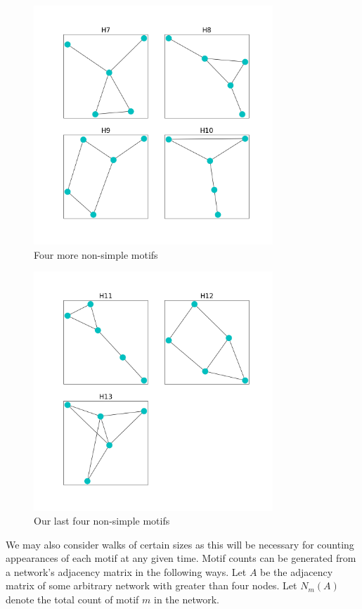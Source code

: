 \begin{figure}[h!]
    \includegraphics[width=9cm]{Images/motif_set_two.png}
    \centering
    \caption{Four more non-simple motifs}
\end{figure}

\begin{figure}
    \includegraphics[width=9cm]{Images/motif_set_three.png}
    \centering
    \caption{Our last four non-simple motifs}
\end{figure}

\FloatBarrier

We may also consider walks of certain sizes as this will be necessary for 
counting appearances of each motif at any given time. Motif counts can be generated from a network's adjacency matrix in the following ways. Let $A$
be the adjacency matrix of some arbitrary network with greater than four nodes. Let $N_m(A)$ denote 
the total count of motif $m$ in the network. 

